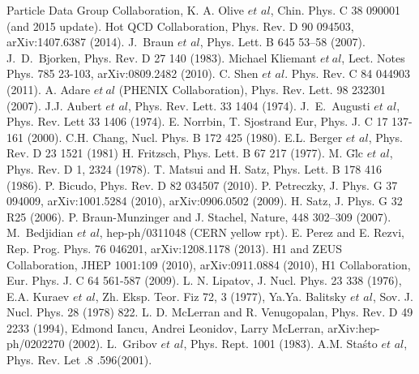\begin{thebibliography}{4}%
 Particle Data Group Collaboration, K. A. Olive $et$ $al$, Chin. Phys. C 38 090001 (and 2015 update).
 Hot QCD Collaboration, Phys. Rev. D 90 094503, arXiv:1407.6387 (2014).
 J.~Braun $et$ $al$, Phys. Lett. B 645 53–58 (2007).
 J.~D.~Bjorken, Phys. Rev. D 27 140 (1983).
 Michael Kliemant $et~al$, Lect. Notes Phys. 785 23-103, arXiv:0809.2482 (2010). 
 C. Shen $et$ $al$. Phys. Rev. C 84 044903 (2011).
 A. Adare $et~al$ (PHENIX Collaboration), Phys. Rev. Lett. 98 232301 (2007).  
 J.J. Aubert $et$ $al$, Phys. Rev. Lett. 33 1404 (1974).
 J.~E.~Augusti $et$ $al$, Phys. Rev. Lett 33 1406 (1974).
 E. Norrbin, T. Sjostrand Eur, Phys. J. C 17 137-161 (2000). 
 C.H. Chang, Nucl. Phys. B 172 425 (1980).
 E.L. Berger $et$ $al$, Phys. Rev. D 23 1521 (1981)
 H. Fritzsch, Phys. Lett. B 67 217 (1977).
 M. Gl̈c $et$ $al$, Phys. Rev. D 1, 2324 (1978).
 T. Matsui and H. Satz, Phys. Lett. B 178 416 (1986).
 P. Bicudo, Phys. Rev. D 82 034507 (2010).
 P. Petreczky, J. Phys. G 37 094009, arXiv:1001.5284 (2010), arXiv:0906.0502 (2009).
 H. Satz, J. Phys. G 32 R25 (2006).
 P. Braun-Munzinger and J. Stachel, Nature, 448 302–309 (2007).
 M.~Bedjidian $et$ $al$, hep-ph/0311048 (CERN yellow rpt).
 E. Perez and E. Rezvi,  Rep. Prog. Phys. 76 046201, arXiv:1208.1178 (2013).
 H1 and ZEUS Collaboration, JHEP 1001:109 (2010), arXiv:0911.0884 (2010), H1 Collaboration, Eur. Phys. J. C 64 561-587 (2009).
 L. N. Lipatov, J. Nucl. Phys. 23 338 (1976), E.A. Kuraev $et$ $al$, Zh. Eksp. Teor. Fiz 72, 3 (1977), Ya.Ya. Balitsky $et$ $al$, Sov. J. Nucl. Phys. 28 (1978) 822.
 L. D. McLerran and R. Venugopalan, Phys. Rev. D 49 2233 (1994), Edmond Iancu, Andrei Leonidov, Larry McLerran, arXiv:hep-ph/0202270 (2002).
 L.~Gribov $et$ $al$, Phys. Rept. 1001 (1983).
 A.M. Staśto $et$ $al$, Phys. Rev. Let  .8 .596(2001).

\end{thebibliography}
